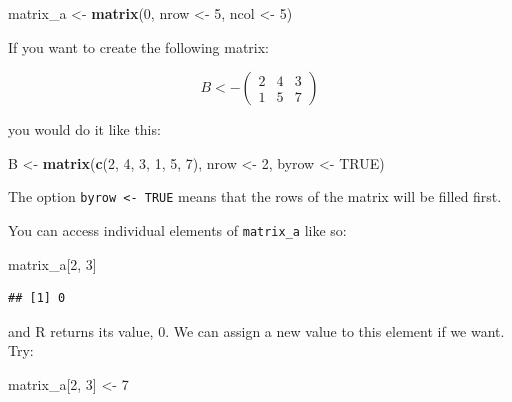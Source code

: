 \documentclass[]{gitbook}
\newenvironment{Shaded}{\begin{snugshade}}{\end{snugshade}}
\newcommand{\DecValTok}[1]{\textcolor[rgb]{0.00,0.00,0.81}{#1}}
\newcommand{\KeywordTok}[1]{\textcolor[rgb]{0.13,0.29,0.53}{\textbf{#1}}}
\newcommand{\NormalTok}[1]{#1}
\newcommand{\OtherTok}[1]{\textcolor[rgb]{0.56,0.35,0.01}{#1}}
\newcommand{\StringTok}[1]{\textcolor[rgb]{0.31,0.60,0.02}{#1}}
\theoremstyle{definition}
\theoremstyle{definition}
\theoremstyle{definition}
\theoremstyle{remark}
\begin{document}
\begin{Shaded}
\begin{Highlighting}[]
\NormalTok{matrix_a <-}\StringTok{ }\KeywordTok{matrix}\NormalTok{(}\DecValTok{0}\NormalTok{, nrow <-}\StringTok{ }\DecValTok{5}\NormalTok{, ncol <-}\StringTok{ }\DecValTok{5}\NormalTok{)}
\end{Highlighting}
\end{Shaded}

If you want to create the following matrix:

\[
B <- \left(
\begin{array}{ccc}
 2 & 4 & 3 \\
 1 & 5 & 7
\end{array} \right)
\]

you would do it like this:

\begin{Shaded}
\begin{Highlighting}[]
\NormalTok{B <-}\StringTok{ }\KeywordTok{matrix}\NormalTok{(}\KeywordTok{c}\NormalTok{(}\DecValTok{2}\NormalTok{, }\DecValTok{4}\NormalTok{, }\DecValTok{3}\NormalTok{, }\DecValTok{1}\NormalTok{, }\DecValTok{5}\NormalTok{, }\DecValTok{7}\NormalTok{), nrow <-}\StringTok{ }\DecValTok{2}\NormalTok{, byrow <-}\StringTok{ }\OtherTok{TRUE}\NormalTok{)}
\end{Highlighting}
\end{Shaded}

The option \texttt{byrow\ \textless{}-\ TRUE} means that the rows of the
matrix will be filled first.

You can access individual elements of \texttt{matrix\_a} like so:

\begin{Shaded}
\begin{Highlighting}[]
\NormalTok{matrix_a[}\DecValTok{2}\NormalTok{, }\DecValTok{3}\NormalTok{]}
\end{Highlighting}
\end{Shaded}

\begin{verbatim}
## [1] 0
\end{verbatim}

and R returns its value, 0. We can assign a new value to this element if
we want. Try:

\begin{Shaded}
\begin{Highlighting}[]
\NormalTok{matrix_a[}\DecValTok{2}\NormalTok{, }\DecValTok{3}\NormalTok{] <-}\StringTok{ }\DecValTok{7}
\end{Highlighting}
\end{Shaded}
\end{document}
